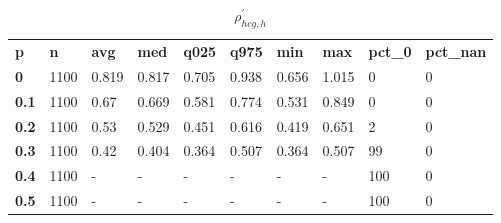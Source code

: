 \begin{table}[h]
 \centering 
\footnotesize
\caption{$\rho_{hcg,h}^\prime $}
\label{tab:alphahcgh}
\begin{tabular}[h]{| l l l l l l l l l l|
    } \hline
\textbf{ p} & \textbf{ n} & \textbf{ avg} & \textbf{ med} & \textbf{ q025} & \textbf{ q975} & \textbf{ min} & \textbf{ max} & \textbf{ pct\_0} & \textbf{ pct\_nan}
           \\
  \textbf{  0} & 1100 & 0.819 & 0.817 & 0.705 & 0.938 & 0.656 & 1.015 &   0 & 0
           \\
  \textbf{0.1} & 1100 &  0.67 & 0.669 & 0.581 & 0.774 & 0.531 & 0.849 &   0 & 0
           \\
  \textbf{0.2} & 1100 &  0.53 & 0.529 & 0.451 & 0.616 & 0.419 & 0.651 &   2 & 0
           \\
  \textbf{0.3} & 1100 &  0.42 & 0.404 & 0.364 & 0.507 & 0.364 & 0.507 &  99 & 0
           \\
  \textbf{0.4} & 1100 & - & - & - & - & - & - & 100 & 0
           \\
  \textbf{0.5} & 1100 & - & - & - & - & - & - & 100 & 0
           \\
 \hline \end{tabular}
 \end{table}
